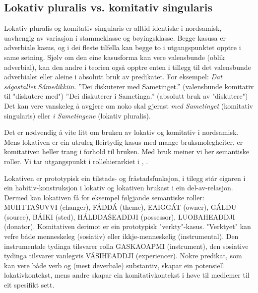 \documentclass[a4paper,norsk]{article}
\begin{document}
\subsection{Lokativ pluralis vs. komitativ singularis}


Lokativ pluralis og komitativ singularis er alltid identiske i nordsamisk, uavhengig av variasjon i stammeklasse og bøyingsklasse. Begge kasusa er adverbiale kasus, og i dei fleste tilfella kan begge to i utgangspunktet opptre i same setning. Sjølv om den eine kasusforma kan vere valensbunde (oblik adverbial), kan den andre i teorien også opptre enten i tillegg til det valensbunde adverbialet eller aleine i absolutt bruk av predikatet.
For eksempel:
\textit {Dat ságastallet Sámedikkiin.}
''Dei diskuterer med Sametinget.'' (valensbunde komitativ til "diskutere med")
''Dei diskuterer i Sametinga.'' (absolutt bruk av "diskutere")
Det kan vere vanskeleg å avgjere om noko skal gjerast \textit{med Sametinget} (komitativ singularis) eller \textit{i Sametingene} (lokativ pluralis). %

Det er nødvendig å vite litt om bruken av lokativ og komitativ i nordsamisk. Mens lokativen er ein utruleg fleirtydig kasus med mange bruksmolegheiter, er komitativen heller trang i forhold til bruken. Med bruk meiner vi her semantiske roller. Vi tar utgangspunkt i rollehierarkiet i \cite{Sammallahti02},\cite{Sammallahti05} %
.

Lokativen er prototypisk ein tilstads- og fråstadsfunksjon, i tilegg står eigaren i ein habitiv-konstruksjon i lokativ og lokativen brukast i ein del-av-relasjon. Dermed kan lokativen få for eksempel følgjande semantiske roller: MUHTTAŠUVVI (changer), FÁDDÁ (theme), EAIGGÁT (owner), GÁLDU (source), BÁIKI (sted), HÁLDDAŠEADDJI (possessor), LUOBAHEADDJI (donator). Komitativen derimot er ein prototypisk "verkty"-kasus. "Verktyet" kan vefre både menneskeleg (sosiativ) eller ikkje-menneskelig (instrumental). Den instrumentale tydinga tilsvarer rolla GASKAOAPMI (instrument), den sosiative tydinga tilsvarer vanlegvis VÁSIHEADDJI (experiencer).
Nokre predikat, som kan vere både verb og (mest deverbale) substantiv, skapar ein potensiell lokativkontekst, mens andre skapar ein komitativkontekst i høve til medlemer til eit spesifikt sett.
\end{document}

